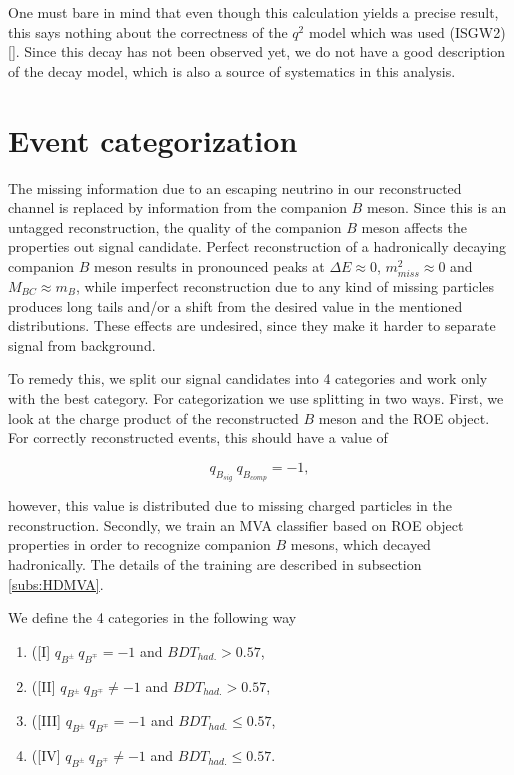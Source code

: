 \documentclass[  headings=standardclasses,
  headings=big,oneside,a4paper,openany,12pt]{scrbook}
\begin{document}
One must bare in mind that even though this calculation yields a precise result, this says nothing about the correctness of the $q^2$ model which was used (ISGW2) []. Since this decay has not been observed yet, we do not have a good description of the decay model, which is also a source of systematics in this analysis.

\section{Event categorization}\label{sec:event-categorization}

The missing information due to an escaping neutrino in our reconstructed channel is replaced by information from the companion $B$ meson. Since this is an untagged reconstruction, the quality of the companion $B$ meson affects the properties out signal candidate. Perfect reconstruction of a hadronically decaying companion $B$ meson results in pronounced peaks at $\Delta E \approx 0$, $m_{miss}^2 \approx 0$ and $M_{BC} \approx m_B$, while imperfect reconstruction due to any kind of missing particles produces long tails and/or a shift from the desired value in the mentioned distributions. These effects are undesired, since they make it harder to separate signal from background.

To remedy this, we split our signal candidates into 4 categories and work only with the best category. For categorization we use splitting in two ways. First, we look at the charge product of the reconstructed $B$ meson and the ROE object. For correctly reconstructed events, this should have a value of 

\begin{equation}
\label{eq:chargeprod}
q_{B_{sig}}~q_{B_{comp}} = -1,
\end{equation}

however, this value is distributed due to missing charged particles in the reconstruction. Secondly, we train an MVA classifier based on ROE object properties in order to recognize companion $B$ mesons, which decayed hadronically. The details of the training are described in subsection \ref{subs:HDMVA}.

We define the 4 categories in the following way
\begin{enumerate} 
\item([I] $q_{B^\pm}~q_{B^\mp} = -1$ and $BDT_{had.} > 0.57$,
\item([II] $q_{B^\pm}~q_{B^\mp} \neq -1$ and $BDT_{had.} > 0.57$,
\item([III] $q_{B^\pm}~q_{B^\mp} = -1$ and $BDT_{had.} \leq 0.57$,
\item([IV] $q_{B^\pm}~q_{B^\mp} \neq -1$ and $BDT_{had.} \leq 0.57$.
\end{enumerate}
\end{document}

